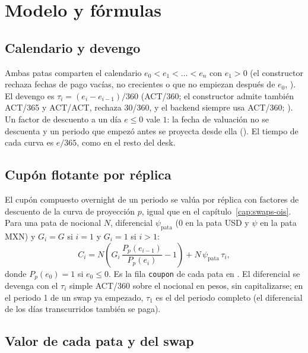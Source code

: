 \section{Modelo y fórmulas}\label{sec:cap07-modelo}

\subsection{Calendario y devengo}\label{sec:cap07-calendario}

Ambas patas comparten el calendario $e_0<e_1<\dots<e_n$ con $e_1>0$ (el constructor rechaza fechas de pago
vacías, no crecientes o que no empiezan después de $e_0$,
). El devengo es
$\tau_i=(e_i-e_{i-1})/360$ (ACT/360; el constructor admite también ACT/365 y ACT/ACT, rechaza 30/360, y el
backend siempre usa ACT/360; ). Un factor de descuento a
un día $e\le0$ vale $1$: la fecha de valuación no se descuenta y un periodo que empezó antes se proyecta desde
ella (). El tiempo de cada curva es $e/365$, como en el
resto del desk.

\subsection{Cupón flotante por réplica}\label{sec:cap07-cupon}

El cupón compuesto overnight de un periodo se valúa por réplica con factores de descuento de la curva de
proyección $p$, igual que en el capítulo~\ref{cap:swaps-ois}. Para una pata de nocional $N$, diferencial
$\psi_{\mathrm{pata}}$ ($0$ en la pata USD y $\psi$ en la pata MXN) y $G_i=G$ si $i=1$ y $G_i=1$ si $i>1$:
\begin{equation}\label{eq:cap07-cupon}
  C_i = N\left(G_i\,\frac{P_p(e_{i-1})}{P_p(e_i)} - 1\right) + N\,\psi_{\mathrm{pata}}\,\tau_i ,
\end{equation}
donde $P_p(e_0)=1$ si $e_0\le0$. Es la fila \texttt{coupon} de cada pata en
. El diferencial se devenga con el $\tau_i$ simple ACT/360 sobre
el nocional en pesos, sin capitalizarse; en el periodo 1 de un swap ya empezado, $\tau_1$ es el del periodo
completo (el diferencial de los días transcurridos también se paga).

\subsection{Valor de cada pata y del swap}\label{sec:cap07-valor}

